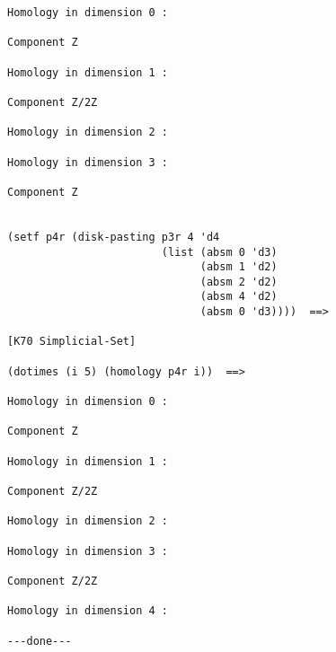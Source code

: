 {\begin{verbatim}
Homology in dimension 0 :

Component Z

Homology in dimension 1 :

Component Z/2Z

Homology in dimension 2 :

Homology in dimension 3 :

Component Z


(setf p4r (disk-pasting p3r 4 'd4 
                        (list (absm 0 'd3)
                              (absm 1 'd2)
                              (absm 2 'd2) 
                              (absm 4 'd2)
                              (absm 0 'd3))))  ==>

[K70 Simplicial-Set]

(dotimes (i 5) (homology p4r i))  ==>

Homology in dimension 0 :

Component Z

Homology in dimension 1 :

Component Z/2Z

Homology in dimension 2 :

Homology in dimension 3 :

Component Z/2Z

Homology in dimension 4 :

---done---
\end{verbatim}}

